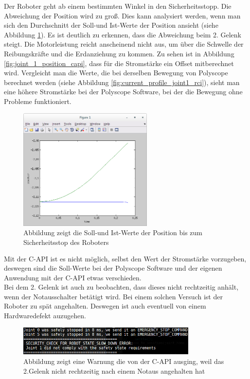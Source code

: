 Der Roboter geht ab einem bestimmten Winkel in den Sicherheitsstopp. Die Abweichung der Position wird zu groß. Dies kann analysiert werden, wenn man sich den Durchschnitt der Soll-und Ist-Werte der Position ansieht (siehe Abbildung \ref{fig:position_join1}). Es ist deutlich zu erkennen, dass die Abweichung beim 2. Gelenk steigt. Die Motorleistung reicht anscheinend nicht aus, um über die Schwelle der Reibungskräfte und die Erdanziehung zu kommen. Zu sehen ist in Abbildung \ref{fig:joint_1_position_capi}, dass für die Stromstärke ein Offset mitberechnet wird. Vergleicht man die Werte, die bei derselben Bewegung von Polyscope berechnet werden (siehe Abbildung \ref{fig:current_profile_joint1_rci}), sieht man eine höhere Stromstärke bei der Polyscope Software, bei der die Bewegung ohne Probleme funktioniert.
\\
\begin{figure}[H]
  \centering
    \includegraphics[width=0.6\textwidth]{pic/joint1_position_capi.png}
      \caption[Soll-und Ist-Werte der Position]{Abbildung zeigt die Soll-und Ist-Werte der Position bis zum Sicherheitsstop des Roboters}
      \label{fig:position_join1}
\end{figure}

Mit der C-API ist es nicht möglich, selbst den Wert der Stromstärke vorzugeben, deswegen sind die Soll-Werte bei der Polyscope Software und der eigenen Anwendung mit der C-API etwas verschieden.
\\
Bei dem 2. Gelenk ist auch zu beobachten, dass dieses nicht rechtzeitig anhält, wenn der Notausschalter betätigt wird. Bei einem solchen Versuch ist der Roboter zu spät angehalten. Deswegen ist auch eventuell von einem Hardwaredefekt auzugehen.

\begin{figure}[H]
  \centering
    \includegraphics[width=0.8\textwidth]{pic/emergency_stop_capi.png}
      \caption[Warnungsausgabe für 2. Gelenk nach Notausschalter]{Abbildung zeigt eine Warnung die von der C-\ac{API} ausging, weil das 2.Gelenk nicht rechtzeitig nach einem Notaus angehalten hat}
      \label{fig:acceleration_ptp_profile}
\end{figure}
\newpage
